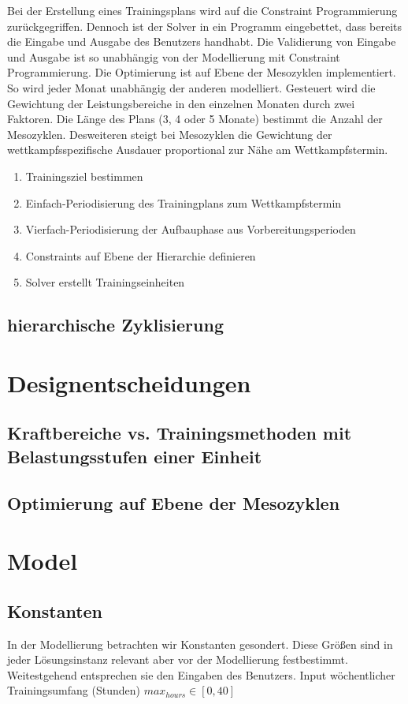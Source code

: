Bei der Erstellung eines Trainingsplans wird auf die Constraint Programmierung zurückgegriffen. Dennoch ist der Solver in ein Programm eingebettet, dass bereits die Eingabe und Ausgabe des Benutzers handhabt. Die Validierung von Eingabe und Ausgabe ist so unabhängig von der Modellierung mit Constraint Programmierung. Die Optimierung ist auf Ebene der Mesozyklen implementiert. So wird jeder Monat unabhängig der anderen modelliert. Gesteuert wird die Gewichtung der Leistungsbereiche in den einzelnen Monaten durch zwei Faktoren. Die Länge des Plans (3, 4 oder 5 Monate) bestimmt die Anzahl der Mesozyklen. Desweiteren steigt bei Mesozyklen die Gewichtung der wettkampfsspezifische Ausdauer proportional  zur Nähe am Wettkampfstermin.
    \begin{enumerate}
        \item Trainingsziel bestimmen
        \item Einfach-Periodisierung des Trainingplans zum Wettkampfstermin
        \item Vierfach-Periodisierung der Aufbauphase aus Vorbereitungsperioden
        \item Constraints auf Ebene der Hierarchie definieren 
        \item Solver erstellt Trainingseinheiten
    \end{enumerate}
    \subsection{hierarchische Zyklisierung}

\section{Designentscheidungen}
\subsection{Kraftbereiche vs. Trainingsmethoden mit Belastungsstufen einer Einheit}
\subsection{Optimierung auf Ebene der Mesozyklen}
    
\section{Model}
\subsection{Konstanten}
In der Modellierung betrachten wir Konstanten gesondert. Diese Größen sind in jeder Lösungsinstanz relevant aber vor der Modellierung festbestimmt. Weitestgehend entsprechen sie den Eingaben des Benutzers.
Input wöchentlicher Trainingsumfang (Stunden)
$max_{hours} \in [0, 40]$

